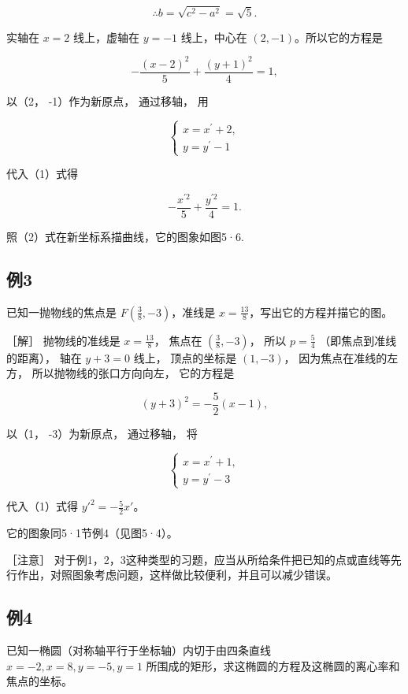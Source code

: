 \[
\therefore b = \sqrt {c^{2} - a^{2}} = \sqrt {5}.
\]

实轴在 \(x = 2\) 线上，虚轴在 \(y = -1\) 线上，中心在
\((2, -1)\)。所以它的方程是

\[
- \frac {(x - 2) ^ {2}}{5} + \frac {(y + 1) ^ {2}}{4} = 1, \tag {1}
\]

以（2， -1）作为新原点， 通过移轴， 用

\[
\left\{ \begin{array}{l} x = x^{\prime} + 2, \\ y = y^{\prime} - 1 \end{array} \right.
\]

代入（1）式得

\[
- \frac {x^{\prime 2}}{5} + \frac {y^{\prime 2}}{4} = 1. \tag {2}
\]

照（2）式在新坐标系描曲线，它的图象如图5·6.

\subsection{例3}\label{ux4f8b3-22}

已知一抛物线的焦点是 \(F\left(\frac{3}{8}, -3\right)\)，准线是
\(x=\frac{13}{8}\)，写出它的方程并描它的图。

［解］ 抛物线的准线是 \(x = \frac{13}{8}\)， 焦点在
\(\left(\frac{3}{8}, -3\right)\)， 所以 \(p = \frac{5}{4}\)
（即焦点到准线的距离）， 轴在 \(y + 3 = 0\) 线上， 顶点的坐标是
\((1, -3)\)， 因为焦点在准线的左方， 所以抛物线的张口方向向左，
它的方程是

\[
(y + 3) ^ {2} = - \frac {5}{2} (x - 1), \tag {1}
\]

以（1， -3）为新原点， 通过移轴， 将

\[
\left\{ \begin{array}{l} x = x^{\prime} + 1, \\ y = y^{\prime} - 3 \end{array} \right.
\]

代入（1）式得 \(y'^2 = -\frac{5}{2} x'\)。

它的图象同5·1节例4（见图5·4）。

［注意］
对于例1，2，3这种类型的习题，应当从所给条件把已知的点或直线等先行作出，对照图象考虑问题，这样做比较便利，并且可以减少错误。

\subsection{例4}\label{ux4f8b4-15}

已知一椭圆（对称轴平行于坐标轴）内切于由四条直线
\(x = -2, x = 8, y = -5, y = 1\)
所围成的矩形，求这椭圆的方程及这椭圆的离心率和焦点的坐标。

